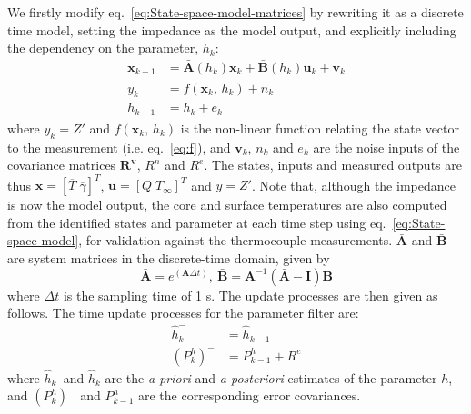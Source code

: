 \documentclass[journal, english]{IEEEtran}
\begin{document}
We firstly modify eq.\ \ref{eq:State-space-model-matrices} by rewriting it as a discrete time model, setting the impedance as the model output, and explicitly including the dependency on the parameter, $h_k$:
\begin{align}
\mathbf{x}_{k+1} & =\bar{\mathbf{A}}(h_{k})\mathbf{x}_{k}+\bar{\mathbf{B}}(h_{k})\mathbf{u}_{k}+\mathbf{v}_{k}\\
y_{k} & =f(\mathbf{x}_{k},\, h_{k})+n_{k}\\
h_{k+1} & =h_{k}+e_{k}\label{eq:param-filt-1}
\end{align}
where $y_{k}=Z'$ and $f(\mathbf{x}_{k},\, h_{k})$ is the non-linear
function relating the state vector to the measurement (i.e. eq.\ \ref{eq:f}), and $\mathbf{v}_{k}$, $n_{k}$ and $e_{k}$ are the noise inputs of the covariance matrices $\mathbf{R}^{\mathbf{v}}$,
$R^{n}$ and $R^{e}$.
The states, inputs and measured outputs are  thus $\mathbf{x}=\left[\overline{T}\;\overline{\gamma}\right]^{T}$,
	$\mathbf{u}=\left[Q\; T_{\infty}\right]^{T}$ and 
	$y=Z'$.
Note that, although the impedance is now the model output, the core and surface temperatures are also computed from the identified states and parameter at each time step using eq.\ \ref{eq:State-space-model}, for validation against the thermocouple measurements.
$\bar{\mathbf{A}}$ and $\bar{\mathbf{B}}$
are system matrices in the discrete-time domain, given by
\begin{equation}
\bar{\mathbf{A}}=e^{(\mathbf{A}\Delta t)},\:\bar{\mathbf{B}}=\mathbf{A}^{-1}(\bar{\mathbf{A}}-\mathbf{I})\mathbf{B}
\end{equation}
where $\Delta t$ is the sampling time of 1 s. The update processes
are then given as follows. The time update processes for the parameter
filter are:
\begin{align}
\hat{h}_{k}^{-} & =\hat{h}_{k-1}\label{eq:param-filt-2}\\
(P_{k}^{h})^{-} & =P_{k-1}^{h}+R^{e}\label{eq:param-filt-3}
\end{align}
where $\hat{h}_{k}^{-}$ and $\hat{h}_{k}$ are the \emph{a priori
}and \emph{a posteriori} estimates of the parameter $h$, and $(P_{k}^{h})^{-}$
and $P_{k-1}^{h}$ are the corresponding\emph{ }error covariances. 
\end{document}
